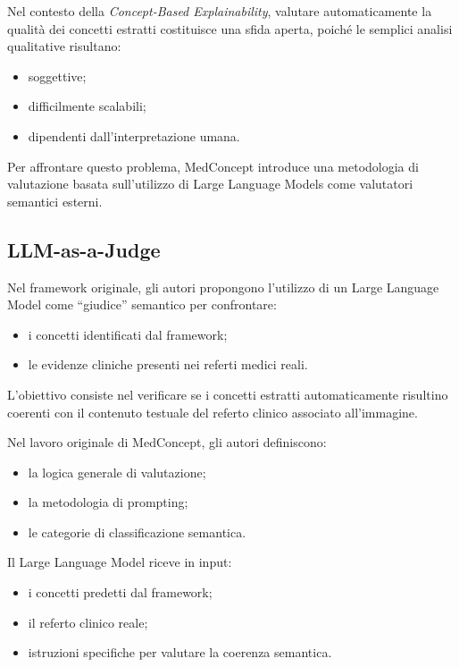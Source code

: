 Nel contesto della \textit{Concept-Based Explainability}, valutare automaticamente la qualità dei concetti estratti costituisce una sfida aperta, poiché le semplici analisi qualitative risultano:

\begin{itemize}
    \item soggettive;
    \item difficilmente scalabili;
    \item dipendenti dall'interpretazione umana.
\end{itemize}

Per affrontare questo problema, MedConcept introduce una metodologia di valutazione basata sull'utilizzo di Large Language Models come valutatori semantici esterni.

\subsection{LLM-as-a-Judge}

Nel framework originale, gli autori propongono l'utilizzo di un Large Language Model come ``giudice'' semantico per confrontare:

\begin{itemize}
    \item i concetti identificati dal framework;
    \item le evidenze cliniche presenti nei referti medici reali.
\end{itemize}

L'obiettivo consiste nel verificare se i concetti estratti automaticamente risultino coerenti con il contenuto testuale del referto clinico associato all'immagine.

Nel lavoro originale di MedConcept, gli autori definiscono:

\begin{itemize}
    \item la logica generale di valutazione;
    \item la metodologia di prompting;
    \item le categorie di classificazione semantica.
\end{itemize}

Il Large Language Model riceve in input:

\begin{itemize}
    \item i concetti predetti dal framework;
    \item il referto clinico reale;
    \item istruzioni specifiche per valutare la coerenza semantica.
\end{itemize}

